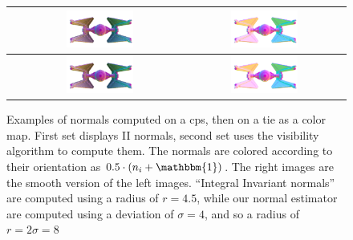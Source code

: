 \begin{figure}
\begin{tabular}{|c||c|c|}
        \hline
        \raisebox{18mm}{II} &
        \includegraphics[width=0.43\textwidth]{pictures/tie256-IIN-flat-edge} &
        \includegraphics[width=0.43\textwidth]{pictures/tie256-IIN-flat} \\
        \hline
        \raisebox{18mm}{Ours} &
        \includegraphics[width=0.43\textwidth]{pictures/tie256-VN-flat-edge} &
        \includegraphics[width=0.43\textwidth]{pictures/tie256-VN-flat} \\
        \hline
    \end{tabular}
    \caption{Examples of normals computed on a cps, then on a
    tie as a color map. First set displays II normals, second set
    uses the visibility algorithm to compute them. The normals are colored
    according to their orientation as $0.5 \cdot (n_i + \mathbbm{1})$. The
    right images are the smooth version of the left images. ``Integral
    Invariant normals'' are computed using a radius of $r=4.5$, while
    our normal estimator are computed using a deviation of $\sigma=4$, and so
    a radius of $r=2\sigma=8$}
    \label{fig:normals-estimation}
\end{figure}

